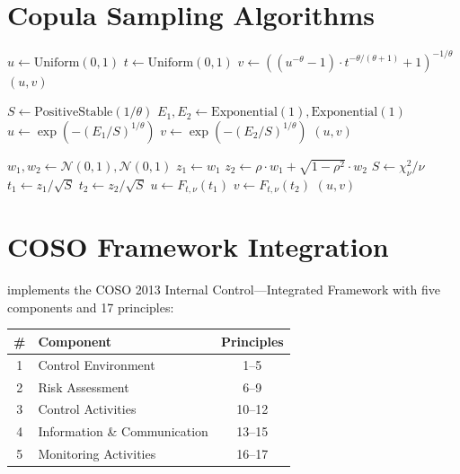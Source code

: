 \section{Copula Sampling Algorithms}
\label{app:copula_algorithms}

\begin{algorithm}[H]
\caption{Clayton Copula Bivariate Sampling}
\label{alg:clayton}
\SetAlgoLined
{}
$u \gets \text{Uniform}(0, 1)$\;
$t \gets \text{Uniform}(0, 1)$\;
$v \gets \left((u^{-\theta} - 1) \cdot t^{-\theta/(\theta+1)} + 1\right)^{-1/\theta}$\;
\Return $(u, v)$\;
\end{algorithm}

\begin{algorithm}[H]
\caption{Gumbel Copula Bivariate Sampling (Marshall-Olkin)}
\label{alg:gumbel}
\SetAlgoLined
{}
$S \gets \text{PositiveStable}(1/\theta)$\;
$E_1, E_2 \gets \text{Exponential}(1), \text{Exponential}(1)$\;
$u \gets \exp(-(E_1 / S)^{1/\theta})$\;
$v \gets \exp(-(E_2 / S)^{1/\theta})$\;
\Return $(u, v)$\;
\end{algorithm}

\begin{algorithm}[H]
\caption{Student-$t$ Copula Bivariate Sampling}
\label{alg:student_t}
\SetAlgoLined
{}
$w_1, w_2 \gets \mathcal{N}(0,1), \mathcal{N}(0,1)$\;
$z_1 \gets w_1$\;
$z_2 \gets \rho \cdot w_1 + \sqrt{1 - \rho^2} \cdot w_2$\;
$S \gets \chi^2_\nu / \nu$\;
$t_1 \gets z_1 / \sqrt{S}$\;
$t_2 \gets z_2 / \sqrt{S}$\;
$u \gets F_{t,\nu}(t_1)$\;
$v \gets F_{t,\nu}(t_2)$\;
\Return $(u, v)$\;
\end{algorithm}

\section{COSO Framework Integration}
\label{app:coso}

\system{} implements the COSO 2013 Internal Control---Integrated
Framework with five components and 17 principles:

\begin{center}
\small
\begin{tabular}{clc}
\toprule
\textbf{\#} & \textbf{Component} & \textbf{Principles} \\
\midrule
1 & Control Environment               & 1--5 \\
2 & Risk Assessment                   & 6--9 \\
3 & Control Activities                & 10--12 \\
4 & Information \& Communication      & 13--15 \\
5 & Monitoring Activities             & 16--17 \\
\bottomrule
\end{tabular}
\end{center}

